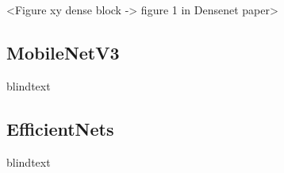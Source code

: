 \vspace{1cm}

<Figure xy dense block -> figure 1 in Densenet paper>

\subsection{MobileNetV3}

blindtext

\subsection{EfficientNets}

blindtext

